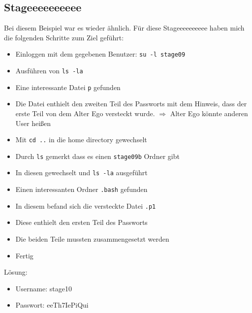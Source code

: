 \documentclass[12pt, a4paper, titlepage, oneside]{scrartcl}
\begin{document}
	\newpage

	\subsection{Stageeeeeeeeee}
	Bei diesem Beispiel war es wieder ähnlich. Für diese Stageeeeeeeeee haben mich
	die folgenden Schritte zum Ziel geführt:

	\begin{itemize}
		\item Einloggen mit dem gegebenen Benutzer: \lstinline{su -l stage09}

		\item Ausführen von \lstinline{ls -la}

		\item Eine interessante Datei \lstinline{p} gefunden

		\item Die Datei enthielt den zweiten Teil des Passworts mit dem Hinweis,
			dass der erste Teil von dem Alter Ego versteckt wurde. $\Rightarrow$ Alter
			Ego könnte anderen User heißen

		\item Mit \lstinline{cd ..} in die home directory gewechselt

		\item Durch \lstinline{ls} gemerkt dass es einen \lstinline{stage09b} Ordner
			gibt

		\item In diesen gewechselt und \lstinline{ls -la} ausgeführt

		\item Einen interessanten Ordner \lstinline{.bash} gefunden

		\item In diesem befand sich die versteckte Datei \lstinline{.p1}

		\item Diese enthielt den ersten Teil des Passworts

		\item Die beiden Teile mussten zusammengesetzt werden

		\item Fertig
	\end{itemize}

	Lösung:
	\begin{itemize}
		\item Username: stage10

		\item Passwort: eeTh7IePiQui
	\end{itemize}
\end{document}
